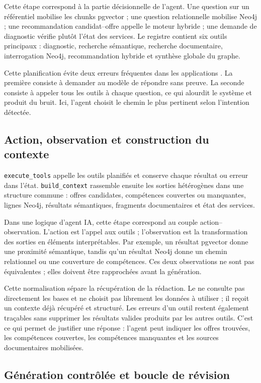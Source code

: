 Cette étape correspond à la partie décisionnelle de l'agent. Une question sur un référentiel mobilise les chunks pgvector ; une question relationnelle mobilise Neo4j ; une recommandation candidat--offre appelle le moteur hybride ; une demande de diagnostic vérifie plutôt l'état des services. Le registre contient six outils principaux : diagnostic, recherche sémantique, recherche documentaire, interrogation Neo4j, recommandation hybride et synthèse globale du graphe.

Cette planification évite deux erreurs fréquentes dans les applications \LLM{}. La première consiste à demander au modèle de répondre sans preuve. La seconde consiste à appeler tous les outils à chaque question, ce qui alourdit le système et produit du bruit. Ici, l'agent choisit le chemin le plus pertinent selon l'intention détectée.

\subsection{Action, observation et construction du contexte}

\texttt{execute\_tools} appelle les outils planifiés et conserve chaque résultat ou erreur dans l'état. \texttt{build\_context} rassemble ensuite les sorties hétérogènes dans une structure commune : offres candidates, compétences couvertes ou manquantes, lignes Neo4j, résultats sémantiques, fragments documentaires et état des services.

Dans une logique d'agent IA, cette étape correspond au couple action--observation. L'action est l'appel aux outils ; l'observation est la transformation des sorties en éléments interprétables. Par exemple, un résultat pgvector donne une proximité sémantique, tandis qu'un résultat Neo4j donne un chemin relationnel ou une couverture de compétences. Ces deux observations ne sont pas équivalentes ; elles doivent être rapprochées avant la génération.

Cette normalisation sépare la récupération de la rédaction. Le \LLM{} ne consulte pas directement les bases et ne choisit pas librement les données à utiliser ; il reçoit un contexte déjà récupéré et structuré. Les erreurs d'un outil restent également traçables sans supprimer les résultats valides produits par les autres outils. C'est ce qui permet de justifier une réponse : l'agent peut indiquer les offres trouvées, les compétences couvertes, les compétences manquantes et les sources documentaires mobilisées.

\subsection{Génération contrôlée et boucle de révision}

